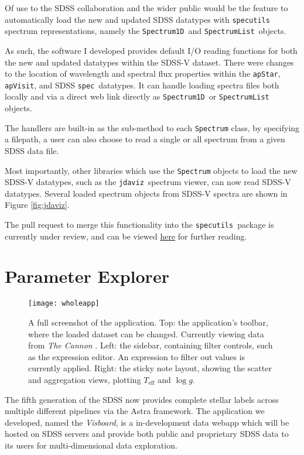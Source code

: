 \documentclass[a4paper,10pt,twocolumn]{article}
\newcommand{\specutils}{\texttt{specutils}}
\newcommand{\jdaviz}{\texttt{jdaviz}}
\newcommand{\visboard}{\emph{Visboard}}
\begin{document}
Of use to the SDSS collaboration and the wider public would be the feature to automatically load the new and updated SDSS datatypes with \specutils\, spectrum representations, namely the \texttt{Spectrum1D}\, and \texttt{SpectrumList}\, objects.

As such, the software I developed provides default I/O reading functions for both the new and updated datatypes within the SDSS-V dataset. There were changes to the location of wavelength and spectral flux properties within the \texttt{apStar}, \texttt{apVisit}, and SDSS \texttt{spec}\, datatypes. It can handle loading spectra files both locally and via a direct web link directly as \texttt{Spectrum1D}\, or \texttt{SpectrumList}\, objects.

The handlers are built-in as the sub-method to each \texttt{Spectrum} class, by specifying a filepath, a user can also choose to read a single or all spectrum from a given SDSS data file.

Most importantly, other libraries which use the \texttt{Spectrum} objects to load the new SDSS-V datatypes, such as the \jdaviz\, spectrum viewer, can now read SDSS-V datatypes. Several loaded spectrum objects from SDSS-V spectra are shown in Figure \ref{fig:jdaviz}.

The pull request to merge this functionality into the \specutils\, package is currently under review, and can be viewed \href{https://github.com/astropy/specutils/pull/1107}{here} for further reading.

\section{Parameter Explorer}
\label{sec:visboard}
\begin{figure*}[t]
	\texttt{[image: wholeapp]}
	\caption{A full screenshot of the application. Top: the application's toolbar, where the loaded dataset can be changed. Currently viewing data from \emph{The Cannon} \parencite{thecannon}. Left: the sidebar, containing filter controls, such as the expression editor. An expression to filter out values is currently applied. Right: the sticky note layout, showing the scatter and aggregation views, plotting $T_{\mathrm{eff}}$ and $\log g$.}
	\label{fig:wholeapp}
\end{figure*}
The fifth generation of the SDSS now provides complete stellar labels across multiple different pipelines via the Astra framework. The application we developed, named the \visboard, is a in-development data webapp which will be hosted on SDSS servers and provide both public and proprietary SDSS data to its users for multi-dimensional data exploration.
\end{document}
